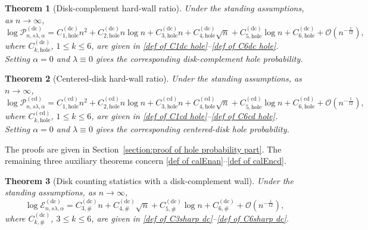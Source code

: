 \documentclass[a4paper]{article}
\newtheorem{theorem}{Theorem}[section]
\numberwithin{equation}{section}
\begin{document}
\begin{theorem}[Disk-complement hard-wall ratio]
\label{theorem:hole probability of disk complement case}
Under the standing assumptions, as $n\to\infty$,
\[
\log \mathcal{P}_{n,s\lambda,\alpha}^{(\mathrm{dc})}
=
C_{1,\mathrm{hole}}^{(\mathrm{dc})}n^2
+C_{2,\mathrm{hole}}^{(\mathrm{dc})}n\log n
+C_{3,\mathrm{hole}}^{(\mathrm{dc})}n
+C_{4,\mathrm{hole}}^{(\mathrm{dc})}\sqrt{n}
+C_{5,\mathrm{hole}}^{(\mathrm{dc})}\log n
+C_{6,\mathrm{hole}}^{(\mathrm{dc})}+\mathcal{O}(n^{-\frac{1}{12}}),
\]
where $C_{k,\mathrm{hole}}^{(\mathrm{dc})}$, $1\leq k\leq6$, are
given in \eqref{def of C1dc hole}--\eqref{def of C6dc hole}.
Setting $\alpha=0$ and $\lambda\equiv0$ gives the corresponding
disk-complement hole probability.
\end{theorem}




\begin{theorem}[Centered-disk hard-wall ratio]
\label{theorem:hole probability of centered disk case}
Under the standing assumptions, as $n\to\infty$,
\[
\log \mathcal{P}_{n,s\lambda,\alpha}^{(\mathrm{cd})}
=
C_{1,\mathrm{hole}}^{(\mathrm{cd})}n^2
+C_{2,\mathrm{hole}}^{(\mathrm{cd})}n\log n
+C_{3,\mathrm{hole}}^{(\mathrm{cd})}n
+C_{4,\mathrm{hole}}^{(\mathrm{cd})}\sqrt{n}
+C_{5,\mathrm{hole}}^{(\mathrm{cd})}\log n
+C_{6,\mathrm{hole}}^{(\mathrm{cd})}+\mathcal{O}(n^{-\frac{1}{12}}),
\]
where $C_{k,\mathrm{hole}}^{(\mathrm{cd})}$, $1\leq k\leq6$, are
given in \eqref{def of C1cd hole}--\eqref{def of C6cd hole}.
Setting $\alpha=0$ and $\lambda\equiv0$ gives the corresponding
centered-disk hole probability.
\end{theorem}
The proofs are given in Section~\ref{section:proof of hole probability part}.
The remaining three auxiliary theorems concern
\eqref{def of calEnan}--\eqref{def of calEncd}.

\begin{theorem}[Disk counting statistics with a disk-complement wall]
\label{theorem:counting statistics of disk complement case}
Under the standing assumptions, as $n\to\infty$,
\[
\log \mathcal{E}_{n,s\lambda,\alpha}^{(\mathrm{dc})}
=
C_{3,\#}^{(\mathrm{dc})}n 
+
C_{4,\#}^{(\mathrm{dc})}\sqrt{n}
+
C_{5,\#}^{(\mathrm{dc})}\log n
+
C_{6,\#}^{(\mathrm{dc})}
+
\mathcal{O}(n^{-\frac{1}{12}}),
\]
where $C_{k,\#}^{(\mathrm{dc})}$, $3\leq k\leq6$, are given in
\eqref{def of C3sharp dc}--\eqref{def of C6sharp dc}.
\end{theorem}
\end{document}

